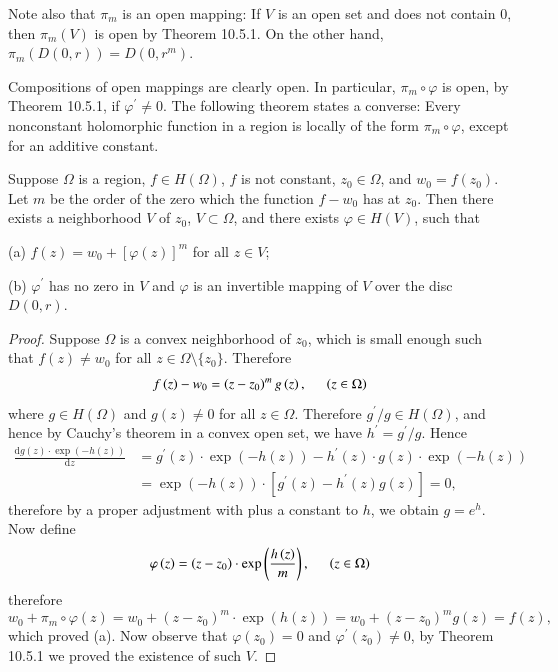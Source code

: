 Note also that $\pi_m$ is an open mapping: If $V$ is an open set and does not contain $0$, then $\pi_m(V)$ is open by Theorem 10.5.1. On the other hand, $\pi_m(D(0,r))=D(0,r^m)$.\par
Compositions of open mappings are clearly open. In particular, $\pi_m\circ\varphi$ is open, by Theorem 10.5.1, if $\varphi^\prime\ne 0$. The following theorem states a converse: Every nonconstant holomorphic function in a region is locally of the form $\pi_m\circ\varphi$, except for an additive constant.
\begin{theorem}
Suppose $\Omega$ is a region, $f\in H(\Omega)$, $f$ is not constant, $z_0\in\Omega$, and $w_0=f(z_0)$. Let $m$ be the order of the zero which the function $f-w_0$ has at $z_0$. Then there exists a neighborhood $V$ of $z_0$, $V\subset\Omega$, and there exists $\varphi\in H(V)$, such that \par
(a) $f(z)=w_0+[\varphi(z)]^m$ for all $z\in V$;\par
(b) $\varphi^\prime$ has no zero in $V$ and $\varphi$ is an invertible mapping of $V$ over the disc $D(0,r)$.
\end{theorem}
\begin{proof}
Suppose $\Omega$ is a convex neighborhood of $z_0$, which is small enough such that $f(z)\ne w_0$ for all $z\in\Omega\setminus\{z_0\}$. Therefore 
$$
f\left( z \right) -w_0=\left( z-z_0 \right) ^mg\left( z \right) ,\hspace{0.5cm}\left( z\in \Omega \right) 
$$
where $g\in H(\Omega)$ and $g(z)\ne 0$ for all $z\in\Omega$. Therefore $g^\prime/g\in H(\Omega)$, and hence by Cauchy's theorem in a convex open set, we have $h^\prime=g^\prime/g$. Hence 
$$
\begin{aligned}
\frac{\mathrm{d}g\left( z \right) \cdot \exp \left( -h\left( z \right) \right)}{\mathrm{d}z}&=g^{\prime}\left( z \right) \cdot \exp \left( -h\left( z \right) \right) -h^{\prime}\left( z \right) \cdot g\left( z \right) \cdot \exp \left( -h\left( z \right) \right) 
\\
&=\exp \left( -h\left( z \right) \right) \cdot \left[ g^{\prime}\left( z \right) -h^{\prime}\left( z \right) g\left( z \right) \right] =0,
\end{aligned}
$$
therefore by a proper adjustment with plus a constant to $h$, we obtain $g=e^h$. Now define 
$$
\varphi \left( z \right) =\left( z-z_0 \right) \cdot \exp \left( \frac{h\left( z \right)}{m} \right) ,\hspace{0.5cm}\left( z\in \Omega \right) 
$$
therefore 
$$
w_0+\pi _m\circ \varphi \left( z \right) =w_0+\left( z-z_0 \right) ^m\cdot \exp \left( h\left( z \right) \right) =w_0+\left( z-z_0 \right) ^mg\left( z \right) =f\left( z \right) ,
$$
which proved (a). Now observe that $\varphi(z_0)=0$ and $\varphi^\prime(z_0)\ne 0$, by Theorem 10.5.1 we proved the existence of such $V$.
\end{proof}
